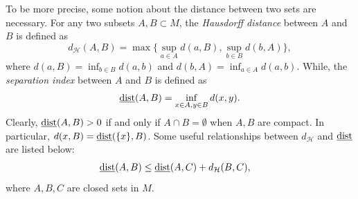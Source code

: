\documentclass[a4paper,11pt]{article}
\theoremstyle{plain}
\newtheorem{lem}[thm]{Lemma}
\theoremstyle{definition}
\numberwithin{equation}{section}
\begin{document}
To be more precise, some notion about the distance between two sets are necessary. For any two subsets $A,B\subset M$, the \textit{Hausdorff distance} between $A$ and $B$ is defined as $$d_{\mathcal{H}}(A,B)=\max\{\sup_{a\in A} d(a,B),\sup_{b\in B} d(b,A)\},$$
where $d(a,B)=\inf_{b\in B}d(a,b)$ and $d(b,A)=\inf_{a\in A}d(a,b)$.
While, the \textit{separation index} between $A$ and $B$ is defined as $${\rm \underline{dist}}(A,B)=\inf_{x\in A,y\in B} d(x,y).$$
Clearly, ${\rm\underline{dist}}(A,B)>0$ if and only if $A\cap B=\emptyset$ when $A,B$ are compact. In particular, $d(x,B)={\rm \underline{dist}}(\{x\},B)$.
Some useful relationships between $d_{\mathcal{H}}$ and ${\rm\underline{dist}}$ are listed below:
\begin{align}
	&{\rm\underline{dist}}(A,B)\leq{\rm\underline{dist}}(A,C)+d_{\mathcal{H}}(B,C),\label{dis_2}
\end{align}
	where $A,B,C$ are closed sets in $ M$. 
    
    
		
\end{document}
